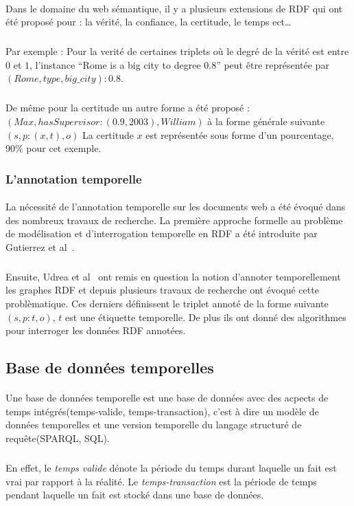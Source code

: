 \documentclass[12pt,a4	]{report}
\begin{document}
\paragraph{}
Dans le domaine du web sémantique, il y a plusieurs extensions de RDF qui ont été proposé pour : la vérité, la confiance, la certitude, le temps ect…
\subparagraph{}
Par exemple : Pour la verité de certaines triplets où le degré de la vérité est entre $0$ et $1$, l’instance “Rome is a big city to degree 0.8” peut être représentée par $(Rome, type,big{\_}city) : 0.8$.
\subparagraph{}
De même pour la certitude un autre forme a été proposé :
$(Max,hasSupervisor : (0.9,2003),William)$ à la forme générale suivante $(s, p : (x,t),o)$
\newline 
La certitude $x$ est représentée sous forme d'un pourcentage, 90\% pour cet exemple.
\subsubsection*{L'annotation temporelle}
\paragraph{}
La nécessité de l’annotation temporelle sur les documents web a été évoqué dans des nombreux travaux de recherche. La première approche formelle au problème de modélisation et d’interrogation temporelle en RDF a été introduite par Gutierrez et al~\cite{gutierrez2005}.
\subparagraph{}
Ensuite, Udrea et al~\cite{udrea2006} ont remis en question la notion d'annoter temporellement les graphes RDF et depuis plusieurs travaux de recherche ont évoqué cette problèmatique. 
Ces derniers définissent le triplet annoté de la forme suivante $(s,p:t,o)$, $t$ est une étiquette temporelle.
De plus ils ont donné des algorithmes pour interroger les données RDF annotées.	
\subsection*{Base de données temporelles}
\paragraph{}
Une base de données temporelle est une base de données avec des acpects de temps intégrés(temps-valide, temps-transaction), c'est à dire un modèle de données temporelles et une version temporelle du langage structuré de requête(SPARQL, SQL).
\subparagraph{}
En effet, le \textit{temps valide} dénote la période du temps durant laquelle un fait est vrai par rapport à la réalité.
Le \textit{temps-transaction} est la période de temps pendant laquelle un fait est stocké dans une base de données.
\end{document}
